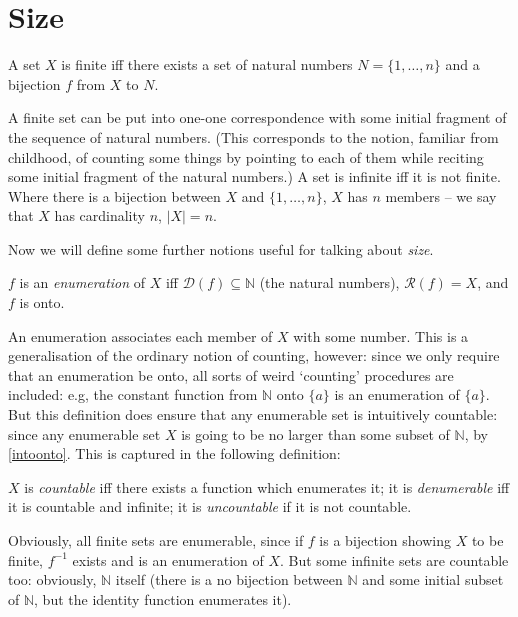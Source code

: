 \section{Size}

\begin{definition}[Finite]
  A set $X$ is finite iff there exists a set of natural numbers $N = \{1,\ldots,n\}$ and a bijection $f$ from $X$ to $N$.
\end{definition} A finite set can be put into one-one correspondence with some initial fragment of the sequence of natural numbers. (This corresponds to the notion, familiar from childhood, of counting some things by pointing to each of them while reciting some initial fragment of the natural numbers.) A set is infinite iff it is not finite. Where there is a bijection between $X$ and $\{1,\ldots,n\}$, $X$ has $n$ members – we say that $X$ has cardinality $n$, $|X|=n$.

Now we will define some further notions useful for talking about \emph{size}.
\begin{definition}[Enumeration] \label{enumer} $f$ is an \emph{enumeration} of $X$ iff $\mathcal{D}(f) \subseteq \mathbb{N}$ (the natural numbers), $\mathcal{R}(f) = X$, and $f$ is onto.
\end{definition} An enumeration associates each member of $X$ with some number. This is a generalisation of the ordinary notion of counting, however: since we only require that an enumeration be onto, all sorts of weird `counting' procedures are included: e.g, the constant function from $\mathbb{N}$ onto $\{a\}$ is an enumeration of $\{a\}$. But this definition does ensure that any enumerable set is intuitively countable: since any enumerable set $X$ is going to be no larger than some subset of $\mathbb{N}$, by \autoref{intoonto}. This is captured in the following definition: 
\begin{definition}[{[Un]}Countable] $X$ is \emph{countable} iff there exists a function which enumerates it; it is \emph{denumerable} iff it is countable and infinite; it is \emph{uncountable} if it is not countable.
\end{definition}
Obviously, all finite sets are enumerable, since if $f$ is a bijection showing $X$ to be finite, $f^{-1}$ exists and is an enumeration of $X$. But some infinite sets are countable too: obviously, $\mathbb{N}$ itself (there is a no bijection between $\mathbb{N}$ and some initial subset of $\mathbb{N}$, but the identity function enumerates it).

